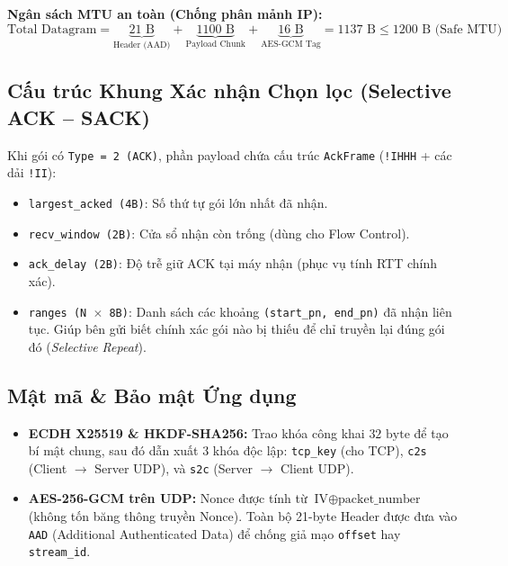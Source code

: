 \textbf{Ngân sách MTU an toàn (Chống phân mảnh IP):}
\[
\text{Total Datagram} = \underbrace{21\text{ B}}_{\text{Header (AAD)}} + \underbrace{1100\text{ B}}_{\text{Payload Chunk}} + \underbrace{16\text{ B}}_{\text{AES-GCM Tag}} = 1137\text{ B} \le 1200\text{ B (Safe MTU)}
\]

\subsection{Cấu trúc Khung Xác nhận Chọn lọc (Selective ACK -- SACK)}
Khi gói có \texttt{Type = 2 (ACK)}, phần payload chứa cấu trúc \texttt{AckFrame} (\texttt{!IHHH} + các dải \texttt{!II}):
\begin{itemize}
    \item \texttt{largest\_acked (4B)}: Số thứ tự gói lớn nhất đã nhận.
    \item \texttt{recv\_window (2B)}: Cửa sổ nhận còn trống (dùng cho Flow Control).
    \item \texttt{ack\_delay (2B)}: Độ trễ giữ ACK tại máy nhận (phục vụ tính RTT chính xác).
    \item \texttt{ranges (N $\times$ 8B)}: Danh sách các khoảng \texttt{(start\_pn, end\_pn)} đã nhận liên tục. Giúp bên gửi biết chính xác gói nào bị thiếu để chỉ truyền lại đúng gói đó (\textit{Selective Repeat}).
\end{itemize}

\subsection{Mật mã & Bảo mật Ứng dụng}
\begin{itemize}
    \item \textbf{ECDH X25519 \& HKDF-SHA256:} Trao khóa công khai $32\text{ byte}$ để tạo bí mật chung, sau đó dẫn xuất 3 khóa độc lập: \texttt{tcp\_key} (cho TCP), \texttt{c2s} (Client $\rightarrow$ Server UDP), và \texttt{s2c} (Server $\rightarrow$ Client UDP).
    \item \textbf{AES-256-GCM trên UDP:} Nonce được tính từ $\text{IV} \oplus \text{packet\_number}$ (không tốn băng thông truyền Nonce). Toàn bộ 21-byte Header được đưa vào \texttt{AAD} (Additional Authenticated Data) để chống giả mạo \texttt{offset} hay \texttt{stream\_id}.
\end{itemize}

